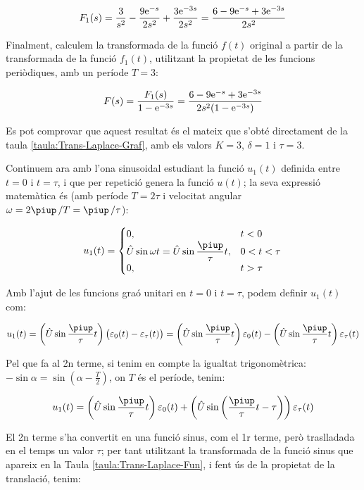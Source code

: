 \begin{exemple}
    \[
        F_1(s) = \frac{3}{s^2} - \frac{9 \mathrm{e}^{-s}}{2 s^2} + \frac{3 \mathrm{e}^{-3s}}{2
        s^2} =\frac{6-9\mathrm{e}^{-s}+3\mathrm{e}^{-3s}}{2s^2}
    \]

    Finalment, calculem la transformada de la funció $f(t)$ original a
    partir de la transformada de la funció $f_1(t)$, utilitzant la
    propietat de les funcions periòdiques, amb un període $T=3$:

    \[
        F(s) = \frac{F_1(s)}{1-\mathrm{e}^{-3s}} = \frac{6-9\mathrm{e}^{-s}+3\mathrm{e}^{-3s}}{2s^2(1-\mathrm{e}^{-3s}) }
    \]

    Es pot comprovar que aquest resultat és el mateix que s'obté directament de la taula \vref{taula:Trans-Laplace-Graf}, amb els valors $K=3$, $\delta=1$ i $\tau=3$.

    Continuem ara  amb l'ona sinusoidal estudiant la funció $u_1(t)$
    definida entre $t=0$ i $t=\tau$, i que per repetició genera la
    funció $u(t)$; la seva expressió matemàtica és (amb període $T=
    2\tau$ i velocitat angular $\omega= 2\piup\,/T  = \piup\,/\tau$):

    \[
        u_1(t) = \begin{cases} 0, & t < 0\\ \hat{U}\sin\omega t =
        \hat{U}\sin\dfrac{\piup}{\tau}t,  & 0<t<\tau \\ 0, & t > \tau \end{cases}
    \]


    Amb l'ajut de les funcions graó unitari en $t=0$ i $t=\tau$, podem
    definir $u_1(t)$ com:

    \[
        u_1(t)=\left(\hat{U}\sin\frac{\piup}{\tau}t\right)\bigl(\varepsilon_0(t)-\varepsilon_\tau(t)\bigr)
        =\left(\hat{U}\sin\frac{\piup}{\tau}t\right)\varepsilon_0(t) - \left(\hat{U}\sin\frac{\piup}{\tau}t\right)\varepsilon_\tau(t)
    \]

    Pel que fa al 2n  terme, si tenim en compte la igualtat
    trigonomètrica: $-\sin \alpha = \sin(\alpha-\frac{T}{2})$, on $T$ és
    el període, tenim:

    \[
        u_1(t) = \left(\hat{U}\sin\frac{\piup}{\tau}t\right)\varepsilon_0(t) +
        \left(\hat{U}\sin\left(\frac{\piup}{\tau}t-\tau\right)\right)\varepsilon_\tau(t)
    \]

    El 2n terme s'ha convertit en una funció sinus, com el 1r terme,
    però traslladada en el temps un valor $\tau$; per tant utilitzant la
    transformada de la funció sinus que apareix en la Taula
    \vref{taula:Trans-Laplace-Fun}, i fent ús de la propietat de la
    translació, tenim:


\end{exemple}
